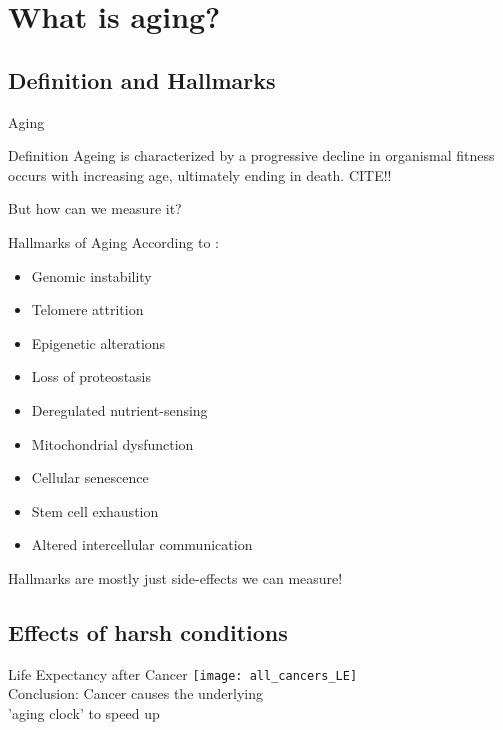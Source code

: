 \section{What is aging?}


\subsection{Definition and Hallmarks}

\begin{frame}[c]{Aging}
    \large

    \begin{block}{Definition}
        Ageing is characterized by a progressive decline in organismal fitness
        occurs with increasing age, ultimately ending in death.  CITE!!
    \end{block}
    \pause
    But how can we measure it?
\end{frame}


\begin{frame}[c]{Hallmarks of Aging}
    According to \cite{lopez2013hallmarks}:
    \begin{itemize}[<+(1)->]
        \item Genomic instability
        \item Telomere attrition
        \item Epigenetic alterations
        \item Loss of proteostasis
        \item Deregulated nutrient-sensing
        \item Mitochondrial dysfunction
        \item Cellular senescence
        \item Stem cell exhaustion
        \item Altered intercellular communication
    \end{itemize}
    \pause
    Hallmarks are mostly just side-effects we can measure!
\end{frame}


\subsection{Effects of harsh conditions}

\begin{frame}[c]{Life Expectancy after Cancer}
    \large
    \texttt{[image: all\_cancers\_LE]} \\
    \cite{botta2019changes}
    \newline
    \newline
    \pause
    Conclusion: Cancer causes the underlying \\ 'aging clock' to speed up
\end{frame}

